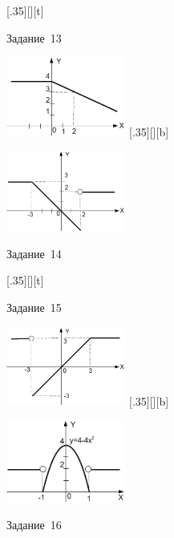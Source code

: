 \begin{figure}[H]
\begin{floatrow}
[.35\textwidth][\FBheight][t]
{\caption{Задание~13}
\label{ch03:refDrawing50}}
{\includegraphics[width=0.35\textwidth,keepaspectratio]{img/ris_3_51}}%
%
[.35\textwidth][\FBheight][b]
{\caption{Задание~14}
\label{ch03:refDrawing51}}
{\includegraphics[width=0.35\textwidth]{img/ris_3_52}}
\end{floatrow}
\end{figure}

\begin{figure}[H]
\begin{floatrow}
[.35\textwidth][\FBheight][t]
{\caption{Задание~15}
\label{ch03:refDrawing52}}
{\includegraphics[width=0.35\textwidth,keepaspectratio]{img/ris_3_53}}%
%
[.35\textwidth][\FBheight][b]
{\caption{Задание~16}
\label{ch03:refDrawing53}}
{\includegraphics[width=0.35\textwidth]{img/ris_3_54}}
\end{floatrow}
\end{figure}

